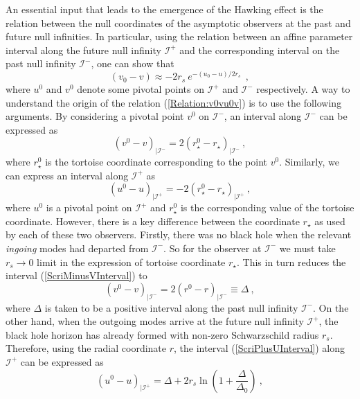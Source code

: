 \documentclass[aps,twocolumn,showpacs]{revtex4}
\def\rs{r_s}
\def\rstar{r_{\star}}
\def\scriplus{\mathscr{I}^{+}}
\def\scriminus{\mathscr{I}^{-}}
\begin{document}
An essential input that leads to the emergence of the Hawking effect is the 
relation between the null coordinates of the asymptotic observers at the past 
and future null infinities. In particular, using the relation between an affine 
parameter interval along the future null infinity $\scriplus$ and the 
corresponding interval on the past null infinity $\scriminus$, one can show that
%
\begin{equation}\label{Relation:v0vu0v}
(v_0 - v) \approx -2\rs~ e^{-(u_0 - u)/2 \rs} ~~,
\end{equation}
%
where $u^0$ and $v^0$ denote some pivotal points on $\scriplus$ and 
$\scriminus$ respectively. A way to understand the origin of the relation 
(\ref{Relation:v0vu0v}) is to use the following arguments. By 
considering a pivotal point $v^0$ on $\scriminus$, an interval along 
$\scriminus$ can be expressed as
%
\begin{equation}\label{ScriMinusVInterval}
(v^0 - v)_{|\scriminus} = 2(\rstar^0 -\rstar)_{|\scriminus}  ~,
\end{equation}
%
where $\rstar^0$ is the tortoise coordinate corresponding to the point $v^0$. 
Similarly, we can express an interval along $\scriplus$ as 
%
\begin{equation}\label{ScriPlusUInterval}
(u^0 - u)_{|\scriplus} = - 2(\rstar^0 -\rstar)_{|\scriplus} ~,
\end{equation}
%
where $u^0$ is a pivotal point on $\scriplus$ and $\rstar^0$ is the 
corresponding value of the tortoise coordinate. However, there is a key 
difference between the coordinate $\rstar$ as used by each of these two 
observers. Firstly, there was no black hole when the relevant \emph{ingoing} 
modes had departed from $\scriminus$. So for the observer at $\scriminus$ we 
must take $\rs\to0$ limit in the expression of tortoise coordinate $\rstar$. 
This in turn reduces the interval (\ref{ScriMinusVInterval}) to
%
\begin{equation}\label{ScriMinusVInterval2}
(v^0 - v)_{|\scriminus} = 2(r^0 -r)_{|\scriminus} \equiv \Delta ~,
\end{equation}
%
where $\Delta$ is taken to be a positive interval along the past null infinity 
$\scriminus$. On the other hand, when the outgoing modes arrive at the future 
null infinity $\scriplus$, the black hole horizon has already formed with
non-zero Schwarzschild radius $\rs$. Therefore, using the 
radial coordinate $r$, the interval (\ref{ScriPlusUInterval}) along $\scriplus$ 
can be expressed  as
%
\begin{equation}\label{ScriMinusUInterval}
(u^0 - u)_{|\scriplus} = \Delta + 
2\rs \ln \left(1 + \frac{\Delta}{\Delta_0}\right) ~,
\end{equation}
\end{document}
